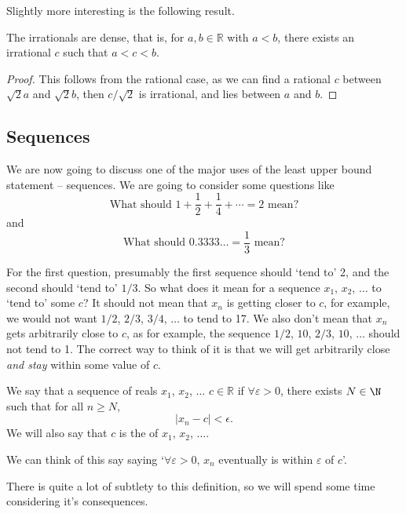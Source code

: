 \documentclass[a4paper]{scrartcl}
\begin{document}
Slightly more interesting is the following result.
\begin{theorem}
	The irrationals are dense, that is, for $a, b\in\mathbb{R}$ with $a<b$, there exists an irrational $c$ such that $a < c < b$.
\end{theorem}
\begin{proof}
	This follows from the rational case, as we can find a rational $c$ between $\sqrt{2}a$ and $\sqrt{2}b$, then $c/\sqrt{2}$ is irrational, and lies between $a$ and $b$.
\end{proof}

\subsection{Sequences}

We are now going to discuss one of the major uses of the least upper bound statement -- sequences. We are going to consider some questions like
$$
\text{What should } 1 + \frac{1}{2} + \frac{1}{4} + \cdots = 2 \text{ mean?}
$$
and 
$$
\text{What should } 0.3333\dots = \frac{1}{3} \text{ mean?}
$$

For the first question, presumably the first sequence should `tend to' 2, and the second should `tend to' $1/3$. So what does it mean for a sequence $x_1$, $x_2$, $\dots$ to `tend to' some $c$? It should not mean that $x_n$ is getting closer to $c$, for example, we would not want $1/2$, $2/3$, $3/4$, $\dots$ to tend to 17. We also don't mean that $x_n$ gets arbitrarily close to $c$, as for example, the sequence $1/2$, $10$, $2/3$, $10$, $\dots$ should not tend to 1.
The correct way to think of it is that we will get arbitrarily close \emph{and stay} within some value of $c$.

\begin{definition}
	We say that a sequence of reals $x_1$, $x_2$, $\dots$  $c \in \mathbb{R}$ if $\forall \varepsilon > 0$, there exists $N \in \N$ such that for all $n \geq N$, 
	$$
	|x_n - c| < \epsilon.
	$$
	We will also say that $c$ is the  of $x_1$, $x_2$, $\dots$.
\end{definition}

\begin{remark}[Informal]
	We can think of this say saying `$\forall \varepsilon > 0$, $x_n$ eventually is within $\varepsilon$ of $c$'.
\end{remark}

There is quite a lot of subtlety to this definition, so we will spend some time considering it's consequences.
\end{document}
